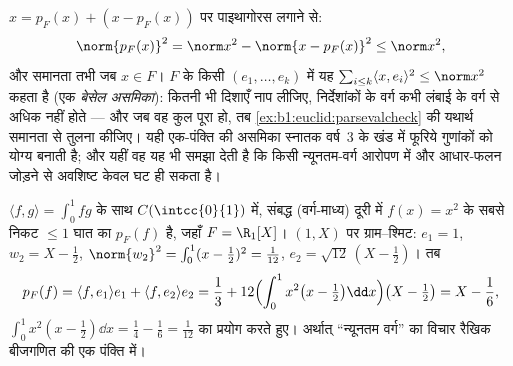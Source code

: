 \begin{example}[प्रक्षेप कभी लंबा नहीं करते]
\label{ex:b1:euclid:bessel}
 $x = p_F(x) + (x - p_F(x))$ पर पाइथागोरस लगाने से:
\[
\norm{p_F(x)}^2 = \norm x^2 - \norm{x - p_F(x)}^2 \leq
\norm x^2 ,
\]
और समानता तभी जब $x \in F$। $F$ के किसी   $(e_1, \dots,
e_k)$ में यह $\sum_{i \leq k}\langle x, e_i\rangle^2 \leq \norm x^2$ कहता है
(एक \emph{बेसेल असमिका}): कितनी भी  दिशाएँ नाप लीजिए,
निर्देशांकों के वर्ग कभी लंबाई के वर्ग से अधिक नहीं होते --- और जब वह कुल
पूरा  हो, तब \cref{ex:b1:euclid:parsevalcheck} की यथार्थ समानता से तुलना
कीजिए। यही एक-पंक्ति की असमिका स्नातक वर्ष~3 के खंड में फूरिये गुणांकों को
योग्य बनाती है; और यहीं वह यह भी समझा देती है कि किसी न्यूनतम-वर्ग आरोपण में
और आधार-फलन जोड़ने से अवशिष्ट केवल घट ही सकता है।
\end{example}

\begin{example}[सर्वोत्तम वर्ग-माध्य सन्निकटन]\label{ex:b1:euclid:bestapprox}
$\langle f, g\rangle = \int_0^1 fg$ के साथ $C(\intcc{0}{1})$ में, संबद्ध
(वर्ग-माध्य) दूरी में $f(x) = x^2$ के सबसे निकट $\leq 1$ घात का 
$p_F(f)$ है, जहाँ $F = \R_1[X]$। $(1, X)$ पर ग्राम--श्मिट: $e_1 = 1$, $w_2 =
X - \frac12$, $\norm{w_2}^2 = \int_0^1 (x - \frac12)^2 = \frac{1}{12}$, $e_2
= \sqrt{12}\,(X - \tfrac12)$। तब
\[
p_F(f) = \langle f, e_1\rangle e_1 + \langle f, e_2\rangle e_2
= \frac13 + 12\Bigl(\int_0^1 x^2\bigl(x - \tfrac12\bigr)\dd
x\Bigr)\bigl(X - \tfrac12\bigr)
= X - \frac{1}{6},
\]
$\int_0^1 x^2(x - \frac12)\dd x = \frac14 - \frac16 = \frac{1}{12}$ का
प्रयोग करते हुए। अर्थात् ``न्यूनतम वर्ग'' का विचार रैखिक बीजगणित की एक
पंक्ति में।
\end{example}

